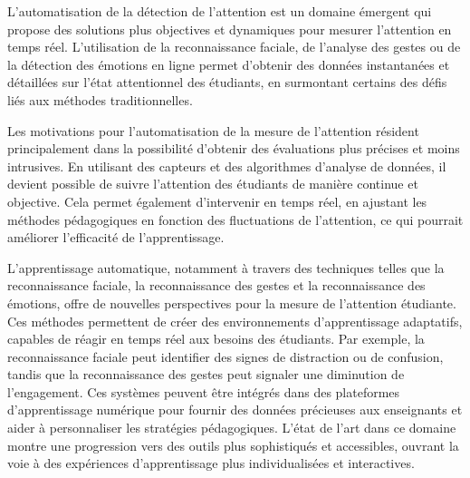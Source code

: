	L'automatisation de la détection de l'attention est un domaine émergent qui propose des solutions plus objectives et dynamiques pour mesurer l'attention en temps réel. L'utilisation de la reconnaissance faciale, de l'analyse des gestes ou de la détection des émotions en ligne permet d'obtenir des données instantanées et détaillées sur l'état attentionnel des étudiants, en surmontant certains des défis liés aux méthodes traditionnelles.
	
	Les motivations pour l'automatisation de la mesure de l'attention résident principalement dans la possibilité d'obtenir des évaluations plus précises et moins intrusives. En utilisant des capteurs et des algorithmes d'analyse de données, il devient possible de suivre l'attention des étudiants de manière continue et objective. Cela permet également d'intervenir en temps réel, en ajustant les méthodes pédagogiques en fonction des fluctuations de l'attention, ce qui pourrait améliorer l'efficacité de l'apprentissage.
	
	L'apprentissage automatique, notamment à travers des techniques telles que la reconnaissance faciale, la reconnaissance des gestes et la reconnaissance des émotions, offre de nouvelles perspectives pour la mesure de l'attention étudiante. Ces méthodes permettent de créer des environnements d'apprentissage adaptatifs, capables de réagir en temps réel aux besoins des étudiants. Par exemple, la reconnaissance faciale peut identifier des signes de distraction ou de confusion, tandis que la reconnaissance des gestes peut signaler une diminution de l'engagement. Ces systèmes peuvent être intégrés dans des plateformes d'apprentissage numérique pour fournir des données précieuses aux enseignants et aider à personnaliser les stratégies pédagogiques. L'état de l'art dans ce domaine montre une progression vers des outils plus sophistiqués et accessibles, ouvrant la voie à des expériences d'apprentissage plus individualisées et interactives.
